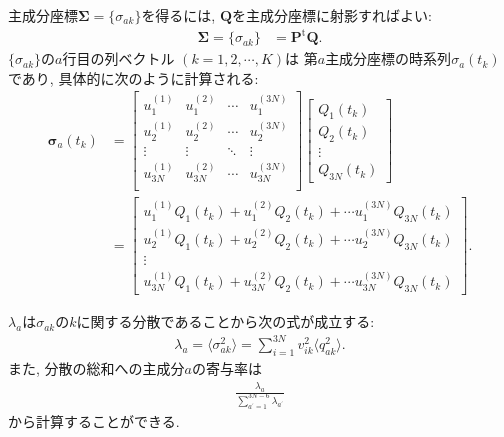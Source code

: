 主成分座標$\mathbf{\Sigma} = \{\sigma_{ak}\}$を得るには, $\mathbf{Q}$を主成分座標に射影すればよい:
\begin{align}
   \mathbf{\Sigma}
 = \{\sigma_{ak}\}
&= \mathbf{P}^{\mathrm{t}} \mathbf{Q}.
\end{align}
$\{\sigma_{ak}\}$の$a$行目の列ベクトル $(k = 1, 2, \cdots, K)$は
第$a$主成分座標の時系列$\sigma_{a}(t_{k})$であり, 具体的に次のように計算される:
\begin{align}
  \mathbf{\sigma}_{a} (t_{k}) &=
   \left[
         \begin{array}{cccc}
           u_{1}^{(1)}  & u_{1}^{(2)}  & \cdots & u_{1}^{(3N)}  \\
           u_{2}^{(1)}  & u_{2}^{(2)}  & \cdots & u_{2}^{(3N)}  \\
             \vdots     &   \vdots     & \ddots &  \vdots       \\
           u_{3N}^{(1)} & u_{3N}^{(2)} & \cdots & u_{3N}^{(3N)} \\
         \end{array}
  \right]
  \left[
        \begin{array}{c}
          Q_{1} (t_{k}) \\
          Q_{2} (t_{k}) \\
          \vdots \\
          Q_{3N} (t_{k})
        \end{array}
  \right]
\\
&=
  \left[
        \begin{array}{c}
          u_{1}^{(1)}  Q_{1} (t_{k}) + u_{1}^{(2)}  Q_{2} (t_{k}) +
          \cdots u_{1}^{(3N)}  Q_{3N} (t_{k})
          \\
          u_{2}^{(1)}  Q_{1} (t_{k}) + u_{2}^{(2)}  Q_{2} (t_{k}) +
          \cdots u_{2}^{(3N)}  Q_{3N} (t_{k})
          \\
          \vdots
          \\
          u_{3N}^{(1)} Q_{1} (t_{k}) + u_{3N}^{(2)} Q_{2} (t_{k}) +
          \cdots u_{3N}^{(3N)} Q_{3N} (t_{k})
        \end{array}
   \right] .
\end{align}

$\lambda_{a}$は$\sigma_{ak}$の$k$に関する分散であることから次の式が成立する:
\begin{align}
 \lambda_{a} =
 \langle \sigma_{ak}^{2} \rangle =
 \sum_{i=1}^{3N} v_{ik}^{2} \langle q_{ak}^{2} \rangle.
\end{align}
また, 分散の総和への主成分$a$の寄与率は
\begin{align}
  \frac{\lambda_{a}}{\sum_{a^{\prime}=1}^{3N-6} \lambda_{a^{\prime}}}
\end{align}
から計算することができる.

